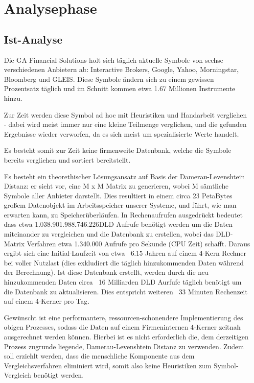 \section{Analysephase}
\subsection{Ist-Analyse}
Die GA Financial Solutions holt sich täglich aktuelle Symbole von sechse verschiedenen
Anbietern ab: Interactive Brokers\cite{IB}, Google, Yahoo, Morningstar, Bloomberg und GLEIS.
Diese Symbole ändern sich zu einem gewissen Prozentsatz täglich und im Schnitt kommen etwa
1.67 Millionen Instrumente hinzu.\par

Zur Zeit werden diese Symbol ad hoc mit Heuristiken und Handarbeit verglichen -
dabei wird meist immer nur eine kleine Teilmenge verglichen, und die gefunden Ergebnisse
wieder verworfen, da es sich meist um spezialisierte Werte handelt.\par

Es besteht somit zur Zeit keine firmenweite Datenbank, welche die Symbole
bereits verglichen und sortiert bereitstellt.\par

Es besteht ein theorethischer Lösungsansatz auf Basis der Damerau-Levenshtein Distanz\footnotemark:
er sieht vor, eine M x M Matrix zu generieren, wobei M sämtliche Symbole aller
Anbieter darstellt. Dies resultiert in einem circa 23 PetaBytes großem Datenobjekt
im Arbeitsspeicher unserer Systeme, und führt, wie man erwarten kann, zu Speicherüberläufen.
In Rechenaufrufen ausgedrückt bedeutet dass etwa 1.038.901.988.746.226\footnotemark DLD Aufrufe
benötigt werden um die Daten miteinander zu vergleichen und die Datenbank zu erstellen,
wobei das DLD-Matrix Verfahren etwa 1.340.000 Aufrufe pro Sekunde (CPU Zeit) schafft.
Daraus ergibt sich eine Initial-Laufzeit von etwa ~6.15 Jahren auf einem 4-Kern
Rechner bei voller Nutzlast (dies exkludiert die täglich hinzukommenden Daten
während der Berechnung). Ist diese Datenbank erstellt, werden durch die neu
hinzukommenden Daten circa ~16 Milliarden DLD Aurfufe täglich benötigt um die
Datenbank zu aktualisieren. Dies entspricht weiteren ~33 Minuten Rechenzeit auf
einem 4-Kerner pro Tag.\par

Gewünscht ist eine performantere, ressourcen-schonendere Implementierung des obigen Prozesses,
sodass die Daten auf einem Firmeninternen 4-Kerner zeitnah ausgerechnet werden können.
Hierbei ist es nicht erforderlich die, dem derzeitigen Prozess zugrunde liegende,
Damerau-Levenshtein Distanz zu verwenden. Zudem soll erziehlt werden, dass die
menschliche Komponente aus dem Vergleichsverfahren eliminiert wird,
somit also keine Heuristiken zum Symbol-Vergleich benötigt werden.\par

